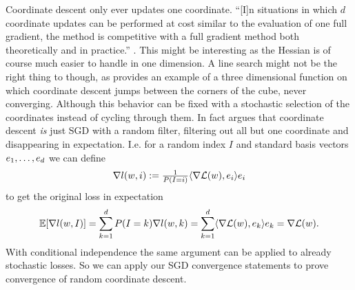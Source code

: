 Coordinate descent only ever updates one coordinate. ``[I]n situations in which
\(d\) coordinate updates can be performed at cost similar to the evaluation of
one full gradient, the method is competitive with a full gradient method both
theoretically and in practice.'' \parencite[7.3, p.
72]{bottouOptimizationMethodsLargeScale2018}. This might be interesting as the
Hessian is of course much easier to handle in one dimension. A line search might
not be the right thing to though, as
\textcite{powellSearchDirectionsMinimization1973} provides an example of a three
dimensional function on which coordinate descent jumps between the
corners of the cube, never converging. Although this behavior can be fixed
with a stochastic selection of the coordinates instead of cycling through them.
In fact \textcite{bubeckConvexOptimizationAlgorithms2015} argues that coordinate
descent \emph{is} just SGD with a random filter, filtering out all
but one coordinate and disappearing in expectation. I.e. for a random index \(I\)
and standard basis vectors \(e_1,\dots,e_d\) we can
define
\begin{align*}
	\nabla l(w, i)
	:= \tfrac1{P(I=i)} \langle \nabla\mathcal{L}(w), e_i \rangle e_i
\end{align*}
to get the original loss in expectation
\begin{align*}
	\mathbb{E}[\nabla l(w,I)] = \sum_{k=1}^d P(I=k) \nabla l(w,k)
	= \sum_{k=1}^d \langle \nabla\mathcal{L}(w), e_k\rangle e_k
	= \nabla\mathcal{L}(w).
\end{align*}
With conditional independence the same argument can be applied to already
stochastic losses. So we can apply our SGD convergence statements to prove
convergence of random coordinate descent.





\endinput
